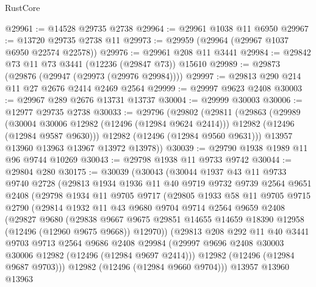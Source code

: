 \begin{lexlean}{RustCore}
\begin{coremodule}
@29961 := @14528 @29735 @2738
@29964 := @29961 @1038 @11 @6950
@29967 := @13720 @29735 @2738 @11
@29973 := @29959 (@29964 (@29967 @1037 @6950 @22574 @22578))
@29976 := @29961 @208 @11 @3441
@29984 := @29842 @73 @11 @73 @3441 (@12236 (@29847 @73)) @15610
@29989 := @29873 (@29876 (@29947 (@29973 (@29976 @29984))))
@29997 := @29813 @290 @214 @11 @27 @2676 @2414 @2469 @2564
@29999 := @29997 @9623 @2408
@30003 := @29967 @289 @2676 @13731 @13737
@30004 := @29999 @30003
@30006 := @12977 @29735 @2738
@30033 := @29796
    (@29802
      (@29811
        (@29863
          (@29989
            (@30004 @30006 @12982 (@12496 (@12984 @9624 @2414)))
            @12982
            (@12496 (@12984 @9587 @9630)))
          @12982
          (@12496 (@12984 @9560 @9631)))
        @13957
        @13960
        @13963
        @13967
        @13972
        @13978))
@30039 := @29790 @1938 @1989 @11 @96 @9744 @10269
@30043 := @29798 @1938 @11 @9733 @9742
@30044 := @29804 @280
@30175 := @30039
    (@30043
      (@30044
        @1937
        @43
        @11
        @9733
        @9740
        @2728
        (@29813
          @1934
          @1936
          @11
          @40
          @9719
          @9732
          @9739
          @2564
          @9651
          @2408
          (@29798
            @1934
            @11
            @9705
            @9717
            (@29805
              @1933
              @58
              @11
              @9705
              @9715
              @2790
              (@29814
                @1932
                @11
                @43
                @9680
                @9704
                @9714
                @2564
                @9659
                @2408
                (@29827
                  @9680
                  (@29838
                    @9667
                    @9675
                    @29851
                    @14655
                    @14659
                    @18390
                    @12958
                    (@12496 (@12960 @9675 @9668))
                    @12970))
                (@29813
                  @208
                  @292
                  @11
                  @40
                  @3441
                  @9703
                  @9713
                  @2564
                  @9686
                  @2408
                  @29984
                  (@29997 @9696 @2408 @30003 @30006 @12982 (@12496 (@12984 @9697 @2414)))
                  @12982
                  (@12496 (@12984 @9687 @9703)))
                @12982
                (@12496 (@12984 @9660 @9704)))
              @13957
              @13960
              @13963

\end{coremodule}
\end{lexlean}

